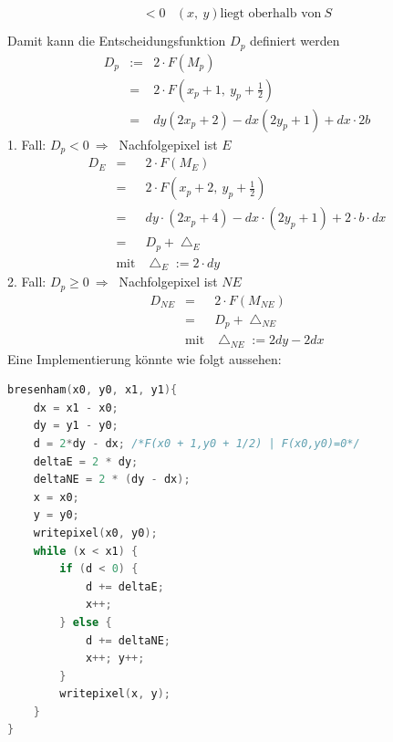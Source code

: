 \begin{Algorithmus}
\begin{equation*}
\begin{matrix}
\begin{matrix}
            < 0 & \left(x,~ y\right) \textrm{liegt oberhalb von}~ S \\
        \end{matrix}
    \end{matrix}\end{equation*}
    Damit kann die Entscheidungsfunktion $D_p$ definiert werden 
    \begin{equation*}\begin{matrix}
        D_p & := & 2 \cdot F\left(M_p\right) \\
        & = & 2 \cdot F\left(x_p + 1,~ y_p + \frac{1}{2}\right) \\
        & = & dy \left(2x_p + 2\right) - dx \left(2y_p + 1\right) + dx \cdot 2b
    \end{matrix}\end{equation*}
    1. Fall: $D_p < 0 ~\Rightarrow~$ Nachfolgepixel ist $E$
    \begin{equation*}\begin{matrix}
        D_E & = & 2 \cdot F\left(M_E\right) \\
        & = & 2 \cdot F\left(x_p + 2,~ y_p + \frac{1}{2}\right) \\
        & = & dy \cdot \left(2 x_p + 4\right) 
            - dx \cdot \left(2 y_p + 1\right) 
            + 2 \cdot b \cdot dx \\
        & = & D_p + \bigtriangleup_E \\
        & \textrm{mit} & \bigtriangleup_E := 2 \cdot dy
    \end{matrix}\end{equation*}
    2. Fall: $D_p \ge 0 ~\Rightarrow~$ Nachfolgepixel ist $NE$ \\
    \begin{equation*}\begin{matrix}
        D_{NE} & = & 2 \cdot F\left( M_{NE} \right) \\
        & = & D_p + \bigtriangleup_{NE} \\
        & \textrm{mit} & \bigtriangleup_{NE} := 2dy - 2dx
    \end{matrix}\end{equation*}
    Eine Implementierung könnte wie folgt aussehen: 
    \begin{lstlisting}[language=C]
bresenham(x0, y0, x1, y1){
    dx = x1 - x0;
    dy = y1 - y0;
    d = 2*dy - dx; /*F(x0 + 1,y0 + 1/2) | F(x0,y0)=0*/
    deltaE = 2 * dy;
    deltaNE = 2 * (dy - dx);
    x = x0;
    y = y0;
    writepixel(x0, y0);
    while (x < x1) {
        if (d < 0) {
            d += deltaE;
            x++;
        } else {
            d += deltaNE;
            x++; y++;
        }
        writepixel(x, y);
    }
}
    \end{lstlisting}
\end{Algorithmus}

